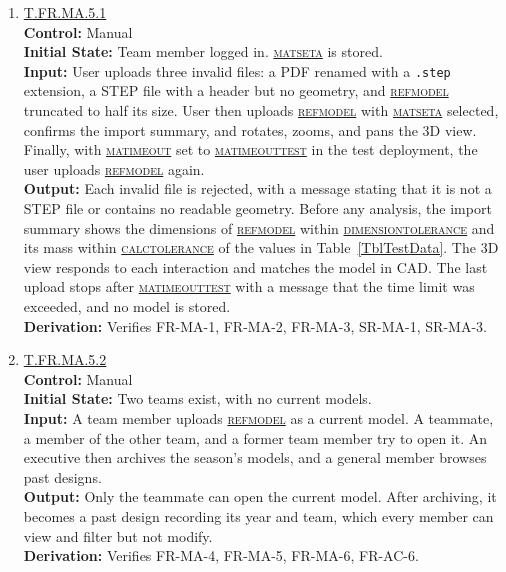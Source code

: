 \documentclass[12pt, titlepage]{article}
\newcommand{\testdef}[1]{\leavevmode\hypertarget{test:#1}{}\hyperlink{trace:#1}{#1}}
\DeclareRobustCommand{\cname}[1]{{\renewcommand{\_}{\textunderscore\allowbreak}\textsc{#1}}}
\newcommand{\constfirst}[1]{\leavevmode\hypertarget{constfirst:\detokenize{#1}}{}\hyperlink{const:\detokenize{#1}}{\cname{#1}}}
\newcommand{\const}[1]{\hyperlink{const:\detokenize{#1}}{\cname{#1}}}
\begin{document}
\begin{enumerate}

\item \testdef{T.FR.MA.5.1}\\
\textbf{Control:} Manual\\
\textbf{Initial State:} Team member logged in. \constfirst{mat\_set\_a} is stored.\\
\textbf{Input:} User uploads three invalid files: a PDF renamed with a
\texttt{.step} extension, a STEP file with a header but no geometry, and
\constfirst{ref\_model} truncated to half its size. User then uploads
\const{ref\_model} with \const{mat\_set\_a} selected, confirms the import
summary, and rotates, zooms, and pans the 3D view. Finally, with
\constfirst{ma\_timeout} set to \constfirst{ma\_timeout\_test} in the test deployment, the
user uploads \const{ref\_model} again.\\
\textbf{Output:} Each invalid file is rejected, with a message stating that it is
not a STEP file or contains no readable geometry. Before any analysis, the import
summary shows the dimensions of \const{ref\_model} within
\constfirst{dimension\_tolerance} and its mass within \constfirst{calc\_tolerance} of the
values in Table~\ref{TblTestData}. The 3D view responds to each interaction and
matches the model in CAD. The last upload stops after \const{ma\_timeout\_test}
with a message that the time limit was exceeded, and no model is stored.\\
\textbf{Derivation:} Verifies FR-MA-1, FR-MA-2, FR-MA-3, SR-MA-1, SR-MA-3.

\item \testdef{T.FR.MA.5.2}\\
\textbf{Control:} Manual\\
\textbf{Initial State:} Two teams exist, with no current models.\\
\textbf{Input:} A team member uploads \const{ref\_model} as a current model. A
teammate, a member of the other team, and a former team member try to open it.
An executive then archives the season's models, and a general member browses
past designs.\\
\textbf{Output:} Only the teammate can open the current model. After archiving, it
becomes a past design recording its year and team, which every member can view
and filter but not modify.\\
\textbf{Derivation:} Verifies FR-MA-4, FR-MA-5, FR-MA-6, FR-AC-6.

\end{enumerate}
\end{document}
